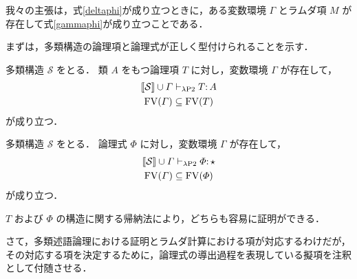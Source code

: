 \documentclass[./main]{subfiles}
\begin{document}
我々の主張は，式\ref{deltaphi}が成り立つときに，ある変数環境 $ \varGamma $ とラムダ項 $ M $ が存在して式\ref{gammaphi}が成り立つことである．


まずは，多類構造の論理項と論理式が正しく型付けられることを示す．

\begin{ziphilprop}
多類構造 $ \mathscr{S} $ をとる．
類 $ A $ をもつ論理項 $ T $ に対し，変数環境 $ \varGamma $ が存在して，
\begin{gather*}
[\![ \mathcal{S} ]\!] \cup \varGamma \vdash _{\lambda \mathrm{P2}} T \mathord{:}\, A \\
\mathop{\mathrm{FV}}\nolimits (\varGamma) \subseteq \mathop{\mathrm{FV}}\nolimits (T)
\end{gather*}
が成り立つ．
\end{ziphilprop}

\begin{ziphilprop} 
多類構造 $ \mathscr{S} $ をとる．
論理式 $ \varPhi $ に対し，変数環境 $ \varGamma $ が存在して，
\begin{gather*}
[\![ \mathcal{S} ]\!] \cup \varGamma \vdash _{\lambda \mathrm{P2}} \varPhi \mathord{:}\, \mathord{\star} \\
\mathop{\mathrm{FV}}\nolimits (\varGamma) \subseteq \mathop{\mathrm{FV}}\nolimits (\varPhi)
\end{gather*}
が成り立つ．
\end{ziphilprop}

$ T $ および $ \varPhi $ の構造に関する帰納法により，どちらも容易に証明ができる．

さて，多類述語論理における証明とラムダ計算における項が対応するわけだが，その対応する項を決定するために，論理式の導出過程を表現している擬項を注釈として付随させる．
\end{document}
